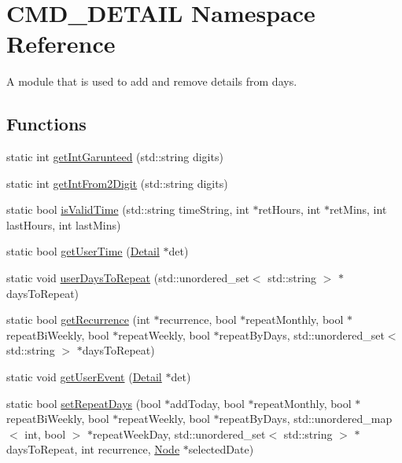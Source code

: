 \hypertarget{namespaceCMD__DETAIL}{\section{C\-M\-D\-\_\-\-D\-E\-T\-A\-I\-L Namespace Reference}
\label{namespaceCMD__DETAIL}
}


A module that is used to add and remove details from days.  


\subsection*{Functions}
\begin{DoxyCompactItemize}
\item 
static int \hyperlink{group__CMD__DETAIL_gae5f62f8c2c8ec4735c4bfba3e8ff1dbe}{get\-Int\-Garunteed} (std\-::string digits)
\item 
static int \hyperlink{group__CMD__DETAIL_gab55ffe2dd662c04c46f186949f67687f}{get\-Int\-From2\-Digit} (std\-::string digits)
\item 
static bool \hyperlink{group__CMD__DETAIL_ga29ba75ec42415d88530bf7d3f03001ef}{is\-Valid\-Time} (std\-::string time\-String, int $\ast$ret\-Hours, int $\ast$ret\-Mins, int last\-Hours, int last\-Mins)
\item 
static bool \hyperlink{group__CMD__DETAIL_ga52e8172ce6105959e8df1e6b66942092}{get\-User\-Time} (\hyperlink{classDetail}{Detail} $\ast$det)
\item 
static void \hyperlink{group__CMD__DETAIL_ga179b6930ace840a1b90415d9445360d3}{user\-Days\-To\-Repeat} (std\-::unordered\-\_\-set$<$ std\-::string $>$ $\ast$days\-To\-Repeat)
\item 
static bool \hyperlink{group__CMD__DETAIL_ga252bd82356adeffbbe613c41329608cb}{get\-Recurrence} (int $\ast$recurrence, bool $\ast$repeat\-Monthly, bool $\ast$repeat\-Bi\-Weekly, bool $\ast$repeat\-Weekly, bool $\ast$repeat\-By\-Days, std\-::unordered\-\_\-set$<$ std\-::string $>$ $\ast$days\-To\-Repeat)
\item 
static void \hyperlink{group__CMD__DETAIL_gaa62607ee248ceddc948be24d50691a04}{get\-User\-Event} (\hyperlink{classDetail}{Detail} $\ast$det)
\item 
static bool \hyperlink{group__CMD__DETAIL_ga95245c4a89879b482ae7ae360b1be3ac}{set\-Repeat\-Days} (bool $\ast$add\-Today, bool $\ast$repeat\-Monthly, bool $\ast$repeat\-Bi\-Weekly, bool $\ast$repeat\-Weekly, bool $\ast$repeat\-By\-Days, std\-::unordered\-\_\-map$<$ int, bool $>$ $\ast$repeat\-Week\-Day, std\-::unordered\-\_\-set$<$ std\-::string $>$ $\ast$days\-To\-Repeat, int recurrence, \hyperlink{classNode}{Node} $\ast$selected\-Date)

\end{DoxyCompactItemize}
